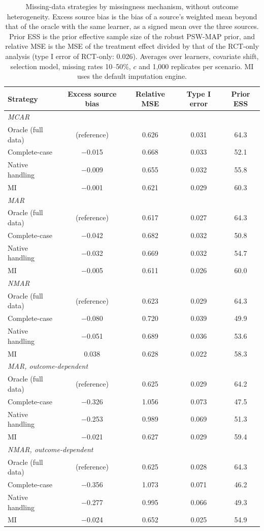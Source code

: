 \begin{table}[ht]
\centering
\caption{Missing-data strategies by missingness mechanism, without outcome heterogeneity. Excess source bias is the bias of a source's weighted mean beyond that of the oracle with the same learner, as a signed mean over the three sources. Prior ESS is the prior effective sample size of the robust PSW-MAP prior, and relative MSE is the MSE of the treatment effect divided by that of the RCT-only analysis (type I error of RCT-only: 0.026). Averages over learners, covariate shift, selection model, missing rates 10--50\%, $c$ and 1{,}000 replicates per scenario. MI uses the default imputation engine.}
\label{tab:main}
\begin{tabular}{lcccc}
\toprule
Strategy & Excess source bias & Relative MSE & Type I error & Prior ESS \\
\midrule
\multicolumn{5}{l}{\textit{MCAR}} \\
\quad Oracle (full data) & (reference) & 0.626 & 0.031 & 64.3 \\
\quad Complete-case & $-$0.015 & 0.668 & 0.033 & 52.1 \\
\quad Native handling & $-$0.009 & 0.655 & 0.032 & 55.8 \\
\quad MI & $-$0.001 & 0.621 & 0.029 & 60.3 \\
\multicolumn{5}{l}{\textit{MAR}} \\
\quad Oracle (full data) & (reference) & 0.617 & 0.027 & 64.3 \\
\quad Complete-case & $-$0.042 & 0.682 & 0.032 & 50.8 \\
\quad Native handling & $-$0.032 & 0.669 & 0.032 & 54.7 \\
\quad MI & $-$0.005 & 0.611 & 0.026 & 60.0 \\
\multicolumn{5}{l}{\textit{NMAR}} \\
\quad Oracle (full data) & (reference) & 0.623 & 0.029 & 64.3 \\
\quad Complete-case & $-$0.080 & 0.720 & 0.039 & 49.9 \\
\quad Native handling & $-$0.051 & 0.689 & 0.036 & 53.6 \\
\quad MI & 0.038 & 0.628 & 0.022 & 58.3 \\
\multicolumn{5}{l}{\textit{MAR, outcome-dependent}} \\
\quad Oracle (full data) & (reference) & 0.625 & 0.029 & 64.2 \\
\quad Complete-case & $-$0.326 & 1.056 & 0.073 & 47.5 \\
\quad Native handling & $-$0.253 & 0.989 & 0.069 & 51.3 \\
\quad MI & $-$0.021 & 0.627 & 0.029 & 59.4 \\
\multicolumn{5}{l}{\textit{NMAR, outcome-dependent}} \\
\quad Oracle (full data) & (reference) & 0.625 & 0.028 & 64.3 \\
\quad Complete-case & $-$0.356 & 1.073 & 0.071 & 46.2 \\
\quad Native handling & $-$0.277 & 0.995 & 0.066 & 49.3 \\
\quad MI & $-$0.024 & 0.652 & 0.025 & 54.9 \\
\bottomrule
\end{tabular}
\end{table}
